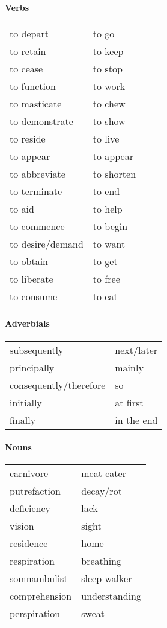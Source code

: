 \documentclass{scrreprt}
\begin{document}
\paragraph{Verbs}
\begin{tabular}{l l}
to depart & to go\\
to retain & to keep\\
to cease & to stop\\
to function & to work\\
to masticate & to chew\\
to demonstrate & to show\\
to reside & to live\\
\hline
to appear & to appear\\
to abbreviate & to shorten\\
to terminate & to end\\
to aid & to help\\
to commence & to begin\\
to desire/demand & to want\\
to obtain & to get\\
to liberate & to free\\
to consume & to eat
\end{tabular}

\paragraph{Adverbials}
\begin{tabular}{l l}
subsequently & next/later\\
principally & mainly\\
consequently/therefore & so\\
initially & at first\\
finally & in the end
\end{tabular}

\paragraph{Nouns}
\begin{tabular}{l l}
carnivore & meat-eater\\
putrefaction & decay/rot\\
deficiency & lack\\
vision & sight\\
residence & home\\
respiration & breathing\\
somnambulist & sleep walker\\
comprehension & understanding\\
perspiration & sweat
\end{tabular}
\end{document}
